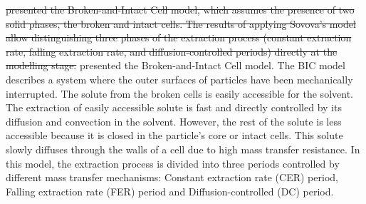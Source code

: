 \documentclass[../Parameter_fitting.tex]{subfiles}
\begin{document}
	\citet{Sovova1994} \sout{presented the Broken-and-Intact Cell model, which assumes the presence of two solid phases, the broken and intact cells. The results of applying Sovova's model allow distinguishing three phases of the extraction process (constant extraction rate, falling extraction rate, and diffusion-controlled periods) directly at the modelling stage.}
	{\color{blue} presented the Broken-and-Intact Cell model. The BIC model describes a system where the outer surfaces of particles have been mechanically interrupted. The solute from the broken cells is easily accessible for the solvent. The extraction of easily accessible solute is fast and directly controlled by its diffusion and convection in the solvent.
		However, the rest of the solute is less accessible because it is closed in the particle's core or intact cells. This solute slowly diffuses through the walls of a cell due to high mass transfer resistance.
		In this model, the extraction process is divided into three periods controlled by different mass transfer mechanisms: Constant extraction rate (CER) period, Falling extraction rate (FER) period and Diffusion-controlled (DC) period.}
	
\end{document}
